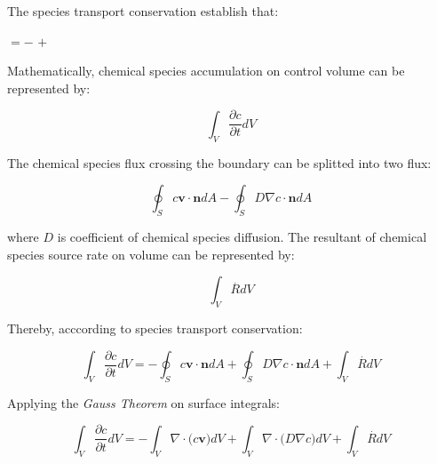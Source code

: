 The species transport conservation establish that:

\medskip
\begin{center}
           $= -$ 
           $+$ 
\end{center}

\medskip
Mathematically, chemical species accumulation on control volume
can be represented by:

\begin{equation} \label{esp 1} 
 \int_{V} \frac{\partial c}{\partial t} dV
\end{equation}

\medskip
The chemical species flux crossing the boundary
can be splitted into two flux:

\begin{equation}  
 \oint_{S} c \textbf{v} \cdot \textbf{n} dA
 -
 \oint_{S} D \nabla c \cdot \textbf{n} dA
\end{equation}

\medskip
\noindent
where $D$ is coefficient of chemical species diffusion. 
The resultant of chemical species source rate
on volume can be represented by:

\begin{equation} 
 \int_{V} \overset{.}{R} dV
\end{equation}

\medskip
\noindent
Thereby, acccording to species transport conservation:

\begin{equation}
 \int_{V} \frac{\partial c}{\partial t} dV
 = 
 - 
 \oint_{S} c \textbf{v} \cdot \textbf{n} dA
 +
 \oint_{S} D \nabla c \cdot \textbf{n} dA
 +
 \int_{V} \overset{.}{R} dV
\end{equation}

\medskip
\noindent
Applying the \textit{Gauss Theorem} on surface integrals:

\begin{equation}
 \int_{V} \frac{\partial c}{\partial t} dV
 = 
 - 
 \int_{V} \nabla \cdot \big( c \textbf{v} \big) dV
 +
 \int_{V} \nabla \cdot \big( D \nabla c \big) dV
 +
 \int_{V} \overset{.}{R} dV
\end{equation}

